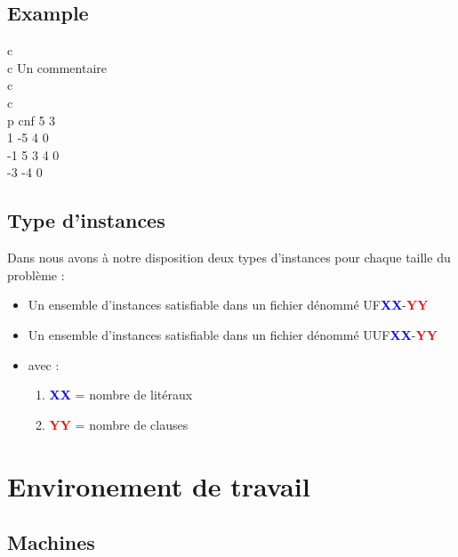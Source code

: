 \subsection{Example}
c\\
c Un commentaire\\
c\\
c \\
p cnf 5 3\\
1 -5 4 0\\
-1 5 3 4 0\\
-3 -4 0\\
\subsection{Type d'instances}
Dans \cite{Benchmark} nous avons à notre disposition deux types d'instances pour chaque taille du problème : \\
\begin{itemize}
	\item Un ensemble d'instances satisfiable dans un fichier dénommé UF\textbf{\textcolor{blue}{XX}}-\textbf{\textcolor{red}{YY}}
	\item Un ensemble d'instances satisfiable dans un fichier dénommé UUF\textbf{\textcolor{blue}{XX}}-\textbf{\textcolor{red}{YY}}
	\item avec : 
	\begin{enumerate}
		\item \textbf{\textcolor{blue}{XX}} = nombre de litéraux
		\item \textbf{\textcolor{red}{YY}} = nombre de clauses
	\end{enumerate}
\end{itemize}
\newpage
\section{Environement de travail}
\subsection{Machines}
